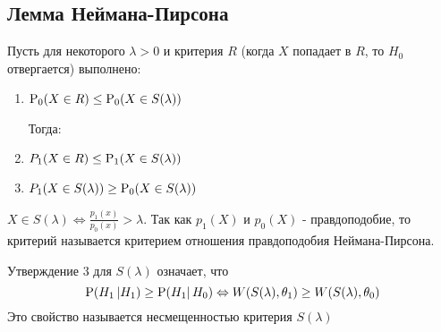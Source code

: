 \subsection{Лемма Неймана-Пирсона}
\begin{theorem*}
    Пусть для некоторого \(\lambda > 0\) и критерия \(R\)
    (когда \(X\) попадает в \(R\), то \(H_0\) отвергается)
    выполнено:
    \begin{enumerate}
        \item  \(\P_0(X\in R) \leq \P_0(X\in S(\lambda))\)

        Тогда:
        \item  \(P_1(X\in R) \leq \P_1(X\in S(\lambda))\)
        \item  \(P_1(X\in S(\lambda)) \geq \P_0(X\in S(\lambda))\)
    \end{enumerate}
\end{theorem*}
\begin{remark}
    \(X\in S(\lambda) \Leftrightarrow \frac{p_1(x)}{p_0(x)} > \lambda\).
    Так как \(p_1(X)\) и \(p_0(X)\) - правдоподобие, то критерий
    называется критерием отношения правдоподобия Неймана-Пирсона.
\end{remark}
\begin{remark}
    Утверждение 3 для \(S(\lambda)\) означает, что
    \[\P(H_1 \left\lvert  H_1) \geq \P(H_1 \right\rvert H_0) \Leftrightarrow W(S(\lambda), \theta_1) \geq W(S(\lambda), \theta_0)\]
    Это свойство называется несмещенностью критерия \(S(\lambda)\)
\end{remark}
